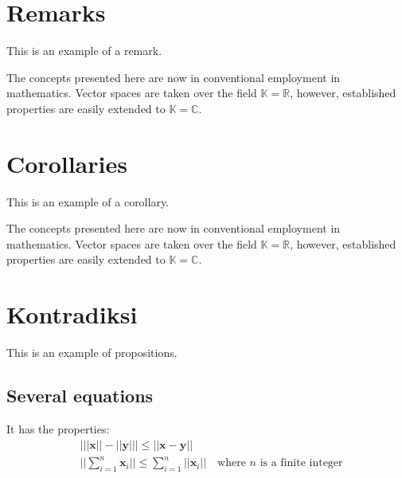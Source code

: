 \documentclass[11pt,fleqn]{book} %
\begin{document}

\section{Remarks}

This is an example of a remark.

\begin{remark}
The concepts presented here are now in conventional employment in mathematics. Vector spaces are taken over the field $\mathbb{K}=\mathbb{R}$, however, established properties are easily extended to $\mathbb{K}=\mathbb{C}$.
\end{remark}


\section{Corollaries}

This is an example of a corollary.

\begin{corollary}
The concepts presented here are now in conventional employment in mathematics. Vector spaces are taken over the field $\mathbb{K}=\mathbb{R}$, however, established properties are easily extended to $\mathbb{K}=\mathbb{C}$.
\end{corollary}


\section{Kontradiksi}

This is an example of propositions.

\subsection{Several equations}

\begin{proposition}
It has the properties:
\begin{align}
& \big| ||\mathbf{x}|| - ||\mathbf{y}|| \big|\leq || \mathbf{x}- \mathbf{y}||\\
&  ||\sum_{i=1}^n\mathbf{x}_i||\leq \sum_{i=1}^n||\mathbf{x}_i||\quad\text{where $n$ is a finite integer}
\end{align}
\end{proposition}
\end{document}
